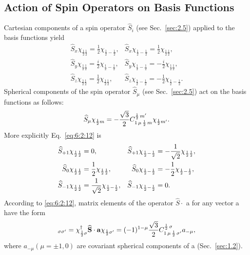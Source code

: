 \subsection{Action of Spin Operators on Basis Functions}\label{sec:6.2.3}
Cartesian components of a spin operator $\widehat{S}_{i}$ (see Sec.~\ref{sec:2.5}) applied to the basis functions yield
\begin{equation}
\begin{aligned}
\widehat{S}_{x} \chi_{\frac{1}{2} \frac{1}{2}}=\frac{1}{2} \chi_{\frac{1}{2}-\frac{1}{2}}, & \widehat{S}_{x} \chi_{\frac{1}{2}-\frac{1}{2}}=\frac{1}{2} \chi_{\frac{1}{2} \frac{1}{2}}, \\
\widehat{S}_{y} \chi_{\frac{1}{2} \frac{1}{2}}=\frac{i}{2} \chi_{\frac{1}{2}-\frac{1}{2}}, & \widehat{S}_{y} \chi_{\frac{1}{2}-\frac{1}{2}}=-\frac{i}{2} \chi_{\frac{1}{2} \frac{1}{2}},\\
\widehat{S}_{z} \chi_{\frac{1}{2} \frac{1}{2}}=\frac{1}{2} \chi_{\frac{1}{2} \frac{1}{2}}, & \widehat{S}_{z} \chi_{\frac{1}{2}-\frac{1}{2}}=-\frac{1}{2} \chi_{\frac{1}{2}-\frac{1}{2}}.
\end{aligned}  \label{eq:6:2:11}
\end{equation}
Spherical components of the spin operator $\widehat{S}_{\mu}$ (see Sec.~\ref{sec:2.5}) act on the basis functions as follows:
\begin{equation}
\widehat{S}_{\mu} \chi_{\frac{1}{2} m}=-\frac{\sqrt{3}}{2} C_{1\,\mu\,\frac{1}{2}\,m}^{\frac{1}{2}\,m^{\prime}} \chi_{\frac{1}{2} m^{\prime}} . \label{eq:6:2:12}
\end{equation}
More explicitly Eq.~\eqref{eq:6:2:12} is
\begin{align}
\widehat{S}_{+1} \chi_{\frac{1}{2} \frac{1}{2}} & =0, & \widehat{S}_{+1} \chi_{\frac{1}{2}-\frac{1}{2}} & =-\frac{1}{\sqrt{2}} \chi_{\frac{1}{2} \frac{1}{2}} , \notag\\
\widehat{S}_{0} \chi_{\frac{1}{2} \frac{1}{2}} & =\frac{1}{2} \chi_{\frac{1}{2} \frac{1}{2}}, & \widehat{S}_{0} \chi_{\frac{1}{2}-\frac{1}{2}} & =-\frac{1}{2} \chi_{\frac{1}{2}-\frac{1}{2}} , \label{eq:6:2:13}\\
\widehat{S}_{-1} \chi_{\frac{1}{2} \frac{1}{2}} & =\frac{1}{\sqrt{2}} \chi_{\frac{1}{2}-\frac{1}{2}}, & \widehat{S}_{-1} \chi_{\frac{1}{2}-\frac{1}{2}} & =0 . \notag
\end{align}
According to \eqref{eq:6:2:12}, matrix elements of the operator $\widehat{S} \cdot$ a for any vector a have the form
\begin{equation}
[\widehat{\vect{S}} \cdot \vect{a}]_{\sigma \sigma^{\prime}}=\chi_{\frac{1}{2} \sigma}^{\dagger} \widehat{\vect{S}} \cdot \vect{a} \chi_{\frac{1}{2} \sigma^{\prime}}=(-1)^{1-\mu} \frac{\sqrt{3}}{2} \clebsch{1}{\mu}{\frac{1}{2}}{\sigma^{\prime}}{\frac{1}{2}}{\sigma} a_{-\mu} , \label{eq:6:2:14}
\end{equation}
where $a_{-\mu}(\mu= \pm 1,0)$ are covariant spherical components of a (Sec.~\ref{sec:1.2}).

